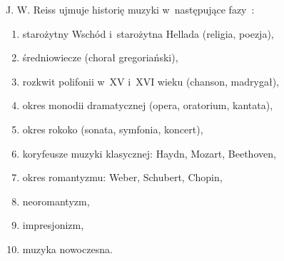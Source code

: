 \documentclass[polish,thesis,12pt]{dcsbook}
\begin{document}
J. W. Reiss ujmuje historię muzyki w~następujące fazy~\cite{Reiss}:

\begin{enumerate}[label=\alph*)]
  \item starożytny Wschód i~starożytna Hellada (religia, poezja),
  \item średniowiecze (chorał gregoriański),
  \item rozkwit polifonii w~XV i~XVI wieku (chanson, madrygał),
  \item okres monodii dramatycznej (opera, oratorium, kantata),
  \item okres rokoko (sonata, symfonia, koncert),
  \item koryfeusze muzyki klasycznej: Haydn, Mozart, Beethoven,
  \item okres romantyzmu: Weber, Schubert, Chopin,
  \item neoromantyzm,
  \item impresjonizm,
  \item muzyka nowoczesna.
\end{enumerate}
\end{document}
